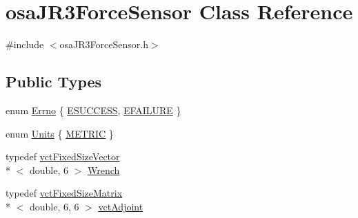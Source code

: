 \hypertarget{classosa_j_r3_force_sensor}{\section{osa\-J\-R3\-Force\-Sensor Class Reference}
\label{classosa_j_r3_force_sensor}
}


{\ttfamily \#include $<$osa\-J\-R3\-Force\-Sensor.\-h$>$}

\subsection*{Public Types}
\begin{DoxyCompactItemize}
\item 
enum \hyperlink{classosa_j_r3_force_sensor_a6b27d3a601fae1547fb13d2a4ef97e4a}{Errno} \{ \hyperlink{classosa_j_r3_force_sensor_a6b27d3a601fae1547fb13d2a4ef97e4aa003231bdd29312cc03b4c91a8688201c}{E\-S\-U\-C\-C\-E\-S\-S}, 
\hyperlink{classosa_j_r3_force_sensor_a6b27d3a601fae1547fb13d2a4ef97e4aaa68c1cf87ef1d6c95b7603f393187218}{E\-F\-A\-I\-L\-U\-R\-E}
 \}
\item 
enum \hyperlink{classosa_j_r3_force_sensor_ac94f1969d4d2089487b912dd0ef7592f}{Units} \{ \hyperlink{classosa_j_r3_force_sensor_ac94f1969d4d2089487b912dd0ef7592faf9d1cb83e02904b93520796fff2d9161}{M\-E\-T\-R\-I\-C}
 \}
\item 
typedef \hyperlink{classvct_fixed_size_vector}{vct\-Fixed\-Size\-Vector}\\*
$<$ double, 6 $>$ \hyperlink{classosa_j_r3_force_sensor_afcfc2ba175b2e7ef9f86c6394c8966d2}{Wrench}
\item 
typedef \hyperlink{classvct_fixed_size_matrix}{vct\-Fixed\-Size\-Matrix}\\*
$<$ double, 6, 6 $>$ \hyperlink{classosa_j_r3_force_sensor_af769666ad69e4db31c2891ddf67d2abd}{vct\-Adjoint}
\end{DoxyCompactItemize}
